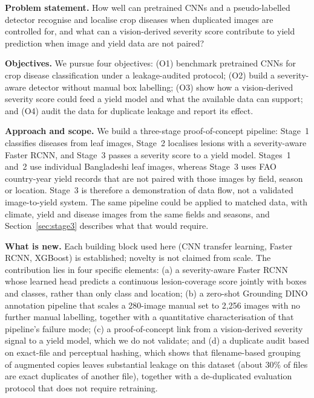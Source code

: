 \noindent\textbf{Problem statement.} How well can pretrained CNNs and a
pseudo-labelled detector recognise and localise crop diseases when
duplicated images are controlled for, and what can a vision-derived
severity score contribute to yield prediction when image and yield data
are not paired?

\noindent\textbf{Objectives.} We pursue four objectives: (O1) benchmark
pretrained CNNs for crop disease classification under a leakage-audited
protocol; (O2) build a severity-aware detector without manual box
labelling; (O3) show how a vision-derived severity score could feed a
yield model and what the available data can support; and (O4) audit the
data for duplicate leakage and report its effect.

\noindent\textbf{Approach and scope.} We build a three-stage
proof-of-concept pipeline: Stage~1 classifies diseases from leaf images,
Stage~2 localises lesions with a severity-aware Faster RCNN, and Stage~3
passes a severity score to a yield model. Stages~1 and~2 use individual
Bangladeshi leaf images, whereas Stage~3 uses FAO country-year yield
records that are not paired with those images by field, season or
location. Stage~3 is therefore a demonstration of data flow, not a
validated image-to-yield system. The same pipeline could be applied to
matched data, with climate, yield and disease images from the same
fields and seasons, and Section~\ref{sec:stage3} describes what that
would require.

\noindent\textbf{What is new.} Each building block used here (CNN
transfer learning, Faster RCNN, XGBoost) is established; novelty is
not claimed from scale. The contribution lies in four specific
elements: (a) a severity-aware Faster RCNN whose learned head predicts
a continuous lesion-coverage score jointly with boxes and classes,
rather than only class and location; (b) a zero-shot Grounding DINO
annotation pipeline that scales a 280-image manual set to 2,256 images
with no further manual labelling, together with a quantitative
characterisation of that pipeline's failure mode; (c) a proof-of-concept
link from a vision-derived severity signal to a yield
model, which we do not validate; and (d) a duplicate audit based on exact-file and perceptual hashing, which shows that filename-based grouping of augmented copies leaves substantial leakage on this dataset (about 30\% of files are exact duplicates of another file), together with a de-duplicated evaluation protocol that does not require retraining.

